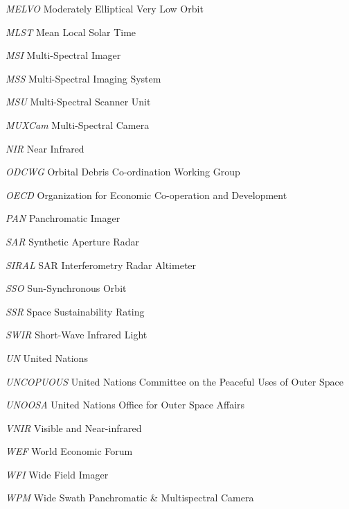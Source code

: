 \documentclass[12pt,a4paper,notitlepage,oneside,openright]{report}
\begin{document}
\begin{abbrv}
\item[\textit{MELVO}] Moderately Elliptical Very Low Orbit
\item[\textit{MLST}] Mean Local Solar Time
\item[\textit{MSI}] Multi-Spectral Imager
\item[\textit{MSS}] Multi-Spectral Imaging System
\item[\textit{MSU}] Multi-Spectral Scanner Unit
\item[\textit{MUXCam}] Multi-Spectral Camera
\item[\textit{NIR}] Near Infrared
\item[\textit{ODCWG}] Orbital Debris Co-ordination Working Group
\item[\textit{OECD}] Organization for Economic Co-operation and Development
\item[\textit{PAN}] Panchromatic Imager
\item[\textit{SAR}] Synthetic Aperture Radar
\item[\textit{SIRAL}] SAR Interferometry Radar Altimeter
\item[\textit{SSO}] Sun-Synchronous Orbit
\item[\textit{SSR}] Space Sustainability Rating
\item[\textit{SWIR}] Short-Wave Infrared Light
\item[\textit{UN}] United Nations
\item[\textit{UNCOPUOUS}] United Nations Committee on the Peaceful Uses of Outer Space
\item[\textit{UNOOSA}] United Nations Office for Outer Space Affairs
\item[\textit{VNIR}] Visible and Near-infrared
\item[\textit{WEF}] World Economic Forum
\item[\textit{WFI}] Wide Field Imager
\item[\textit{WPM}] Wide Swath Panchromatic \& Multispectral Camera
\end{abbrv}
\end{document}
